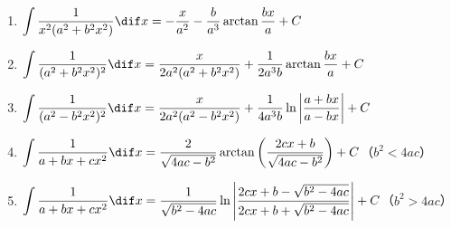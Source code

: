 \begin{enumerate}[1.,itemsep=5pt,resume]
  \item $\displaystyle \int \frac{1}{x^2(a^2+b^2x^2)}\dif x =-\frac{x}{a^2}-\frac{b}{a^3}\arctan\frac{bx}{a}+C$
  \item $\displaystyle \int \frac{1}{(a^2+b^2x^2)^2}\dif x =\frac{x}{2a^2(a^2+b^2x^2)}+\frac{1}{2a^3b}\arctan\frac{bx}{a}+C$
  \item $\displaystyle \int \frac{1}{(a^2-b^2x^2)^2}\dif x =\frac{x}{2a^2(a^2-b^2x^2)}+\frac{1}{4a^3b}\ln\left|\frac{a+bx}{a-bx}\right|+C$
  \item $\displaystyle \int \frac{1}{a+bx+cx^2}\dif x =\frac{2}{\sqrt{4ac-b^2}}\arctan\left(\frac{2cx+b}{\sqrt{4ac-b^2}} \right) +C$（$b^2<4ac$）
  \item $\displaystyle \int \frac{1}{a+bx+cx^2}\dif x =\frac{1}{\sqrt{b^2-4ac}}\ln\left|\frac{2cx+b-\sqrt{b^2-4ac}}{2cx+b+\sqrt{b^2-4ac}}\right|+C$（$b^2>4ac$）
\end{enumerate}

